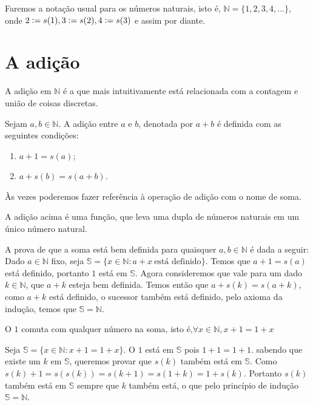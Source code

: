 \documentclass[../main.tex]{subfiles}
\begin{document}
Faremos a notação usual para os números naturais, isto é, $\mathbb{N} = \{ 1, 2, 3, 4, ...\}$, onde $2 \vcentcolon= s(1), 3 \vcentcolon= s(2), 4 \vcentcolon= s(3)$ e assim por diante.



\section{A adição}
A adição em $\mathbb{N}$ é a que mais intuitivamente está relacionada com a contagem e união de coisas discretas.
\begin{defi}\label{def-adicao-N}
Sejam $a, b \in \mathbb{N}$. A adição entre $a$ e $b$, denotada por $a + b$ é definida com as seguintes condições: 
    \begin{enumerate}[label=(\roman*)]
        \item $a + 1 = s(a)$;
        \item $a + s(b) = s(a+b)$.
    \end{enumerate}
\end{defi}
Às vezes poderemos fazer referência à operação de adição com o nome de soma.

\begin{teo}
    A adição acima é uma função, que leva uma dupla de números naturais em um único número natural.
\end{teo}
\begin{dem}
    A prova de que a soma está bem definida para quaisquer $a,b \in \mathbb{N}$ é dada a seguir:
    Dado $a \in \mathbb{N}$ fixo, seja $\mathbb{S} = \{ x \in \mathbb{N} : a + x \ \text{está definido} \}$. Temos que $a + 1 = s(a)$ está definido, portanto $1$ está em $\mathbb{S}$. 
    Agora consideremos que vale para um dado $k \in \mathbb{N}$, que $a+k$ esteja bem definida. Temos então que $a + s(k) = s(a+k)$, como $a+k$ está definido, o sucessor também está definido, pelo axioma da indução, temos que $\mathbb{S} = \mathbb{N}$.
\end{dem}
\begin{lema}\label{soma-n-um-comut}
    O $1$ comuta com qualquer número na soma, isto é,$ \forall x \in \mathbb{N}, x + 1 = 1 + x$
\end{lema}
\begin{dem}
    Seja $\mathbb{S} = \{ x \in \mathbb{N} : x + 1 = 1 + x\}$. O $1$ está em $\mathbb{S}$ pois $1 + 1 = 1 + 1$.
    sabendo que existe um $k$ em $\mathbb{S}$, queremos provar que $s(k)$ também está em $\mathbb{S}$. Como
    $s(k) + 1 = s(s(k)) = s(k+1) = s(1+k) = 1 + s(k)$. Portanto $s(k)$ também está em $\mathbb{S}$ sempre que $k$ também está, o que pelo princípio de indução $\mathbb{S} = \mathbb{N}$.
\end{dem} \\
\end{document}
